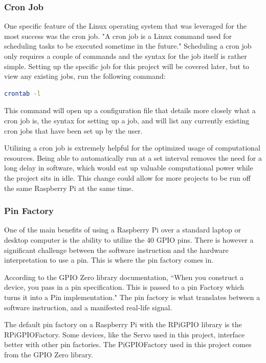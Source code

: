 \documentclass[titlepage]{article}
\begin{document}
\subsubsection*{Cron Job}
One specific feature of the Linux operating system that was leveraged for the most success was the cron job. "A cron job is a Linux command used for scheduling tasks to be executed sometime in the future."\cite{cron_job} Scheduling a cron job only requires a couple of commands and the syntax for the job itself is rather simple. Setting up the specific job for this project will be covered later, but to view any existing jobs, run the following command:
\begin{lstlisting}[language=bash]
crontab -l
\end{lstlisting}
This command will open up a configuration file that details more closely what a cron job is, the syntax for setting up a job, and will list any currently existing cron jobs that have been set up by the user. \par
Utilizing a cron job is extremely helpful for the optimized usage of computational resources. Being able to automatically run at a set interval removes the need for a long delay in software, which would eat up valuable computational power while the project sits in idle. This change could allow for more projects to be run off the same Raspberry Pi at the same time. 
\subsubsection*{Pin Factory}
One of the main benefits of using a Raspberry Pi over a standard laptop or desktop computer is the ability to utilize the 40 GPIO pins. There is however a significant challenge between the software instruction and the hardware interpretation to use a pin. This is where the pin factory comes in. \par
According to the GPIO Zero library documentation, ``When you construct a device, you pass in a pin specification. This is passed to a pin Factory which turns it into a Pin implementation."\cite{pin_factory} The pin factory is what translates between a software instruction, and a manifested real-life signal. \par
The default pin factory on a Raspberry Pi with the RPiGPIO library is the RPiGPIOFactory. Some devices, like the Servo used in this project, interface better with other pin factories. The PiGPIOFactory used in this project comes from the GPIO Zero library. 
\end{document}
